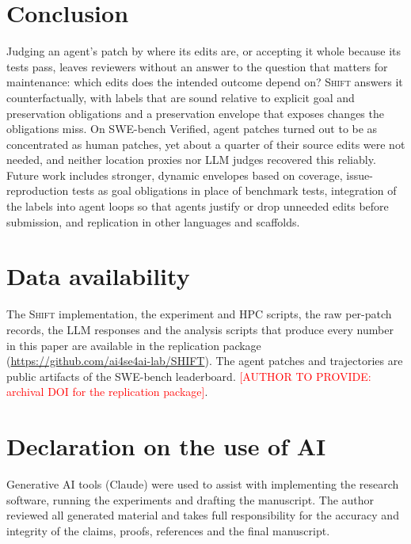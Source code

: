 \documentclass[a4paper,fleqn]{cas-sc}
\newcommand{\tool}{\textsc{Shift}}
\newcommand{\pending}[1]{\textcolor{red}{[#1]}}
\begin{document}
\section{Conclusion}\label{sec:conclusion}
Judging an agent's patch by where its edits are, or accepting it whole because its tests pass, leaves reviewers without an answer to the question that matters for maintenance: which edits does the intended outcome depend on? \tool{} answers it counterfactually, with labels that are sound relative to explicit goal and preservation obligations and a preservation envelope that exposes changes the obligations miss. On SWE-bench Verified, agent patches turned out to be as concentrated as human patches, yet about a quarter of their source edits were not needed, and neither location proxies nor LLM judges recovered this reliably. Future work includes stronger, dynamic envelopes based on coverage, issue-reproduction tests as goal obligations in place of benchmark tests, integration of the labels into agent loops so that agents justify or drop unneeded edits before submission, and replication in other languages and scaffolds.


\section*{Data availability}
The \tool{} implementation, the experiment and HPC scripts, the raw per-patch records, the LLM responses and the analysis scripts that produce every number in this paper are available in the replication package (\url{https://github.com/ai4se4ai-lab/SHIFT}). The agent patches and trajectories are public artifacts of the SWE-bench leaderboard. \pending{AUTHOR TO PROVIDE: archival DOI for the replication package}.

\section*{Declaration on the use of AI}
Generative AI tools (Claude) were used to assist with implementing the research software, running the experiments and drafting the manuscript. The author reviewed all generated material and takes full responsibility for the accuracy and integrity of the claims, proofs, references and the final manuscript.



\end{document}
